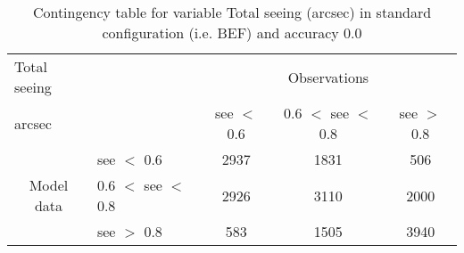 \begin{table}[]
\begin{center}
\begin{tabular}{llccc}
\hline
{Total seeing}                                       &                                                    & \multicolumn{3}{c}{Observations}                 \\
{arcsec}                                       &                             & see $<$ 0.6   & 0.6 $<$ see $<$ 0.8 & see $>$ 0.8 \\
\hline
\multicolumn{1}{c}{\multirow{3}{*}{Model data}}  & see $<$ 0.6             & 2937                & 1831                       & 506              \\
                                                 & 0.6  $<$ see $<$ 0.8 & 2926                & 3110                       & 2000              \\
                                                 & see $>$ 0.8             & 583                & 1505                       & 3940              \\
\hline
\end{tabular}
\end{center}
\caption{Contingency table for variable Total seeing (arcsec) in standard configuration (i.e. BEF) and accuracy 0.0}
\label{tab:contingencyseeBEF}
\end{table}
